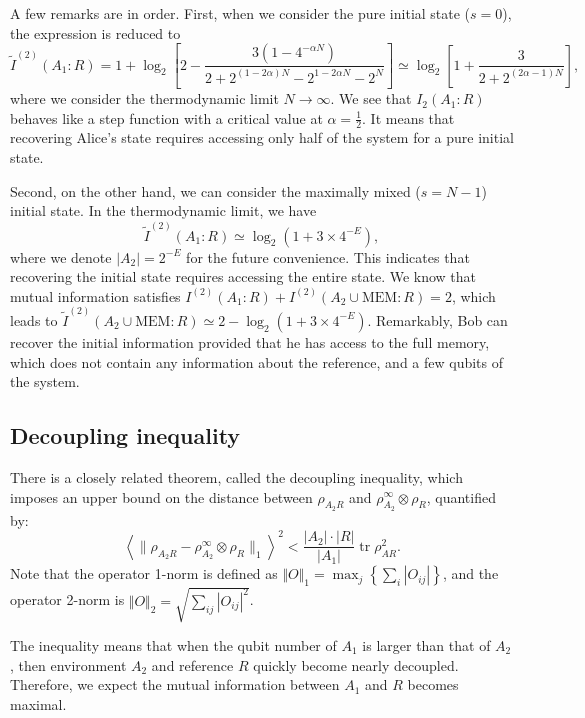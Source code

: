 \documentclass[aps,prb,superscriptaddress,nofootinbib]{revtex4}
\def \tr{\operatorname{tr}}
\begin{document}
A few remarks are in order.
First, when we consider the pure initial state ($s=0$), the expression is reduced to
\begin{equation}
	\tilde I^{(2)}(A_1: R)
	= 1 + \log_2 \left[ 2 - \frac{3(1-4^{-\alpha N})}{2 + 2^{(1-2\alpha)N}-2^{1-2\alpha N}-2^N} \right] 
	\simeq \log_2\left[1 + \frac{3}{2 + 2^{(2\alpha-1)N}}\right],
\end{equation}
where we consider the thermodynamic limit $N\rightarrow \infty$.
We see that $I_2(A_1:R)$ behaves like a step function with a critical value at $\alpha=\frac{1}{2}$.
It means that recovering Alice's state requires accessing only half of the system for a pure initial state.

Second, on the other hand, we can consider the maximally mixed ($s=N-1$) initial state. 
In the thermodynamic limit, we have
\begin{equation}
	\tilde I^{(2)}(A_1:R) \simeq \log_2\left(1+3\times 4^{-E}\right),
\end{equation}
where we denote $|A_2| = 2^{-E}$ for the future convenience.
This indicates that recovering the initial state requires accessing the entire state.
We know that mutual information satisfies $I^{(2)}(A_1:R) + I^{(2)}(A_2\cup\mathrm{MEM}:R) = 2$, which leads to $\tilde I^{(2)}(A_2\cup\mathrm{MEM}:R) \simeq 2 - \log_2(1+3\times 4^{-E})$.
Remarkably, Bob can recover the initial information provided that he has access to the full memory, which does not contain any information about the reference, and a few qubits of the system.


\subsection{Decoupling inequality}
There is a closely related theorem, called the decoupling inequality, which imposes an upper bound on the distance between $\rho_{A_2R}$ and $\rho_{A_2}^\infty\otimes\rho_R$, quantified by:
\begin{equation}
	\left\langle\|\rho_{A_2 R}-\rho^\infty_{A_2}\otimes \rho_R\|_1\right\rangle^2
	< \frac{|A_2|\cdot|R|}{|A_1|}\tr\rho_{AR}^2.
\end{equation}
Note that the operator 1-norm is defined as $\Vert O \Vert_1 = \max_j\left\{\sum_i|O_{ij}|\right\}$, and the operator 2-norm is $\Vert O \Vert_2 = \sqrt{\sum_{ij}|O_{ij}|^2}$.

The inequality means that when the qubit number of $A_1$ is larger than that of $A_2$, then environment $A_2$ and reference $R$ quickly become nearly decoupled.
Therefore, we expect the mutual information between $A_1$ and $R$ becomes maximal.
\end{document}
